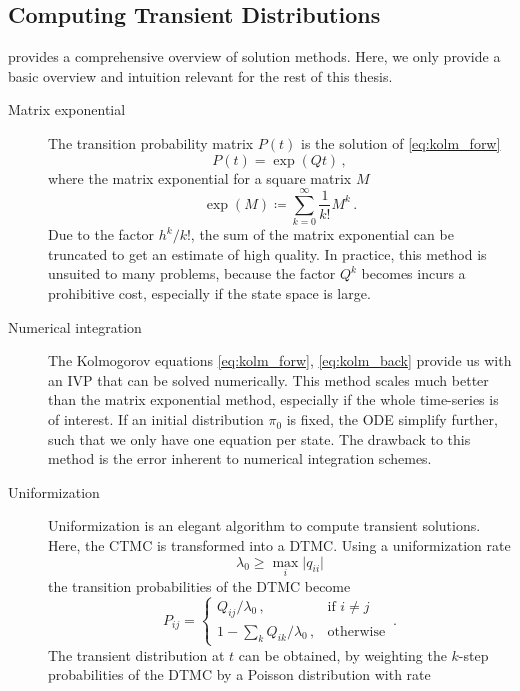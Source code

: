\subsection{Computing Transient Distributions}
\citet{stewart1994introduction} provides a comprehensive overview of solution methods.
Here, we only provide a basic overview and intuition relevant for the rest of this thesis.
\begin{description}
    \item[Matrix exponential]
        The transition probability matrix $P(t)$ is the solution of \eqref{eq:kolm_forw}
        \[
            P(t)=\exp(Qt)\,,
        \]
        where the matrix exponential for a square matrix $M$
        \[
        \exp({M})\coloneqq\sum_{k=0}^{\infty}\frac{1}{k!}M^k\,.
    \]
        Due to the factor ${h^k}/{k!}$, the sum of the matrix exponential
        can be truncated to get an estimate
        of high quality. In practice, this method is unsuited to many problems, because
        the factor $Q^k$ becomes incurs a prohibitive cost, especially if the state space
        is large.
    \item[Numerical integration]
        The Kolmogorov equations \eqref{eq:kolm_forw}, \eqref{eq:kolm_back}
        provide us with an \ac{IVP} that can be solved
        numerically.
        This method scales much better than the matrix exponential method,
        especially if the whole time-series is of interest. If an initial distribution
        $\pi_0$ is fixed, the \ac{ODE} simplify further, such that we only have one equation
        per state.
        The drawback to this method is the error inherent to numerical
        integration schemes.
    \item[Uniformization]\label{item:uniformization}
        Uniformization is an elegant algorithm to compute transient solutions.
        Here, the \ac{CTMC} is transformed into a \ac{DTMC}\@.
        Using a uniformization rate \[\lambda_0\geq\max_{i}\lvert q_{ii}\rvert\]
        the transition probabilities of the \ac{DTMC} become
        \[
        P_{ij} =
        \begin{cases}
            Q_{ij} / \lambda_0\,, &\text{if } i\neq j\\
            1 - \sum_k Q_{ik} / \lambda_0\,, &\text{otherwise}
        \end{cases}\,.
    \]
        The transient distribution at $t$ can be obtained, by weighting the $k$-step
        probabilities of the \ac{DTMC} by a Poisson distribution with rate

\end{description}
